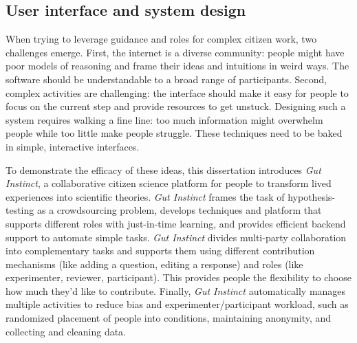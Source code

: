 


\subsection{User interface and system design}

When trying to leverage guidance and roles for complex citizen work, two challenges emerge. First, the internet is a diverse community: people might have poor models of reasoning and frame their ideas and intuitions in weird ways. The software should be understandable to a broad range of participants. Second, complex activities are challenging: the interface should make it easy for people to focus on the current step and provide resources to get unstuck. Designing such a system requires walking a fine line: too much information might overwhelm people while too little make people struggle. These techniques need to be baked in simple, interactive interfaces.

To demonstrate the efficacy of these ideas, this dissertation introduces \textit{Gut Instinct}, a collaborative citizen science platform for people to transform lived experiences into scientific theories. \textit{Gut Instinct} frames the task of hypothesis-testing as a crowdsourcing problem, develops techniques and platform that supports different roles with just-in-time learning, and provides efficient backend support to automate simple tasks. \textit{Gut Instinct} divides multi-party collaboration into complementary tasks and supports them using different contribution mechanisms (like adding a question, editing a response) and roles (like experimenter, reviewer, participant). This provides people the flexibility to choose how much they’d like to contribute. Finally, \textit{Gut Instinct} automatically manages multiple activities to reduce 
bias and experimenter/participant workload, such as randomized placement of  people into conditions, maintaining anonymity, and collecting and cleaning data.

